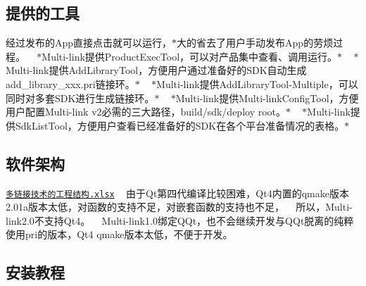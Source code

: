 \subsection*{提供的工具}

经过发布的\+App直接点击就可以运行，$\ast$大的省去了用户手动发布\+App的劳烦过程。 ~\newline
$\ast$\+Multi-\/link提供\+Product\+Exec\+Tool，可以对产品集中查看、调用运行。$\ast$ ~\newline
$\ast$\+Multi-\/link提供\+Add\+Library\+Tool，方便用户通过准备好的\+S\+D\+K自动生成add\+\_\+library\+\_\+xxx.pri链接环。$\ast$ ~\newline
$\ast$\+Multi-\/link提供\+Add\+Library\+Tool-\/\+Multiple，可以同时对多套\+S\+D\+K进行生成链接环。$\ast$ ~\newline
$\ast$\+Multi-\/link提供\+Multi-\/link\+Config\+Tool，方便用户配置\+Multi-\/link v2必需的三大路径，build/sdk/deploy root。$\ast$ ~\newline
$\ast$\+Multi-\/link提供\+Sdk\+List\+Tool，方便用户查看已经准备好的\+S\+D\+K在各个平台准备情况的表格。$\ast$ ~\newline
 \subsection*{软件架构}

\href{Multi-linkFunctionList.xlsx}{\tt 多链接技术的工程结构.\+xlsx} ~\newline
由于\+Qt第四代编译比较困难，\+Qt4内置的qmake版本2.01a版本太低，对函数的支持不足，对嵌套函数的支持也不足， ~\newline
所以，\+Multi-\/link2.0不支持\+Qt4。 ~\newline
Multi-\/link1.\+0绑定\+Q\+Qt，也不会继续开发与\+Q\+Qt脱离的纯粹使用pri的版本，\+Qt4 qmake版本太低，不便于开发。 ~\newline
 \subsection*{安装教程}


